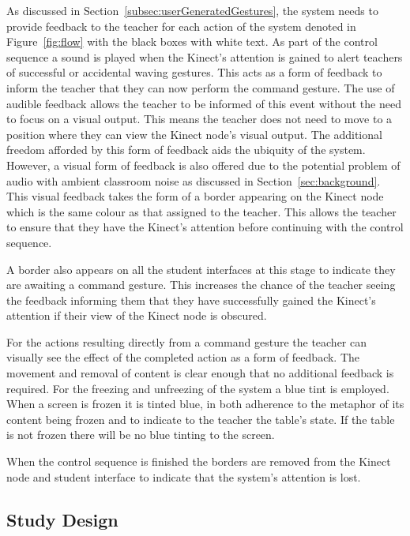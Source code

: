 \documentclass[link]{IWCOMP}
\begin{document}
As discussed in Section~\ref{subsec:userGeneratedGestures}, the system needs to provide feedback to the teacher for each action of the system denoted in Figure~\ref{fig:flow} with the black boxes with white text.
As part of the control sequence a sound is played when the Kinect's attention is gained to alert teachers of successful or accidental waving gestures.
This acts as a form of feedback to inform the teacher that they can now perform the command gesture.
The use of audible feedback allows the teacher to be informed of this event without the need to focus on a visual output.
This means the teacher does not need to move to a position where they can view the Kinect node's visual output.
The additional freedom afforded by this form of feedback aids the ubiquity of the system.
However, a visual form of feedback is also offered due to the potential problem of audio with ambient classroom noise as discussed in Section~\ref{sec:background}.
This visual feedback takes the form of a border appearing on the Kinect node which is the same colour as that assigned to the teacher.
This allows the teacher to ensure that they have the Kinect's attention before continuing with the control sequence.

A border also appears on all the student interfaces at this stage to indicate they are awaiting a command gesture.
This increases the chance of the teacher seeing the feedback informing them that they have successfully gained the Kinect's attention if their view of the Kinect node is obscured.

For the actions resulting directly from a command gesture the teacher can visually see the effect of the completed action as a form of feedback.
The movement and removal of content is clear enough that no additional feedback is required.
For the freezing and unfreezing of the system a blue tint is employed.
When a screen is frozen it is tinted blue, in both adherence to the metaphor of its content being frozen and to indicate to the teacher the table's state.
If the table is not frozen there will be no blue tinting to the screen.

When the control sequence is finished the borders are removed from the Kinect node and student interface to indicate that the system's attention is lost.

\subsection{Study Design}
\label{subsec:pilotStudyDesign}
\end{document}
